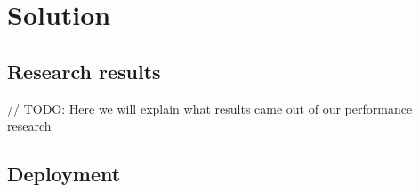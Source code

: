 
\chapter{Solution} %

\label{Chapter4} 


\section{Research results}

// TODO: Here we will explain what results came out of our performance research


\section{Deployment}
